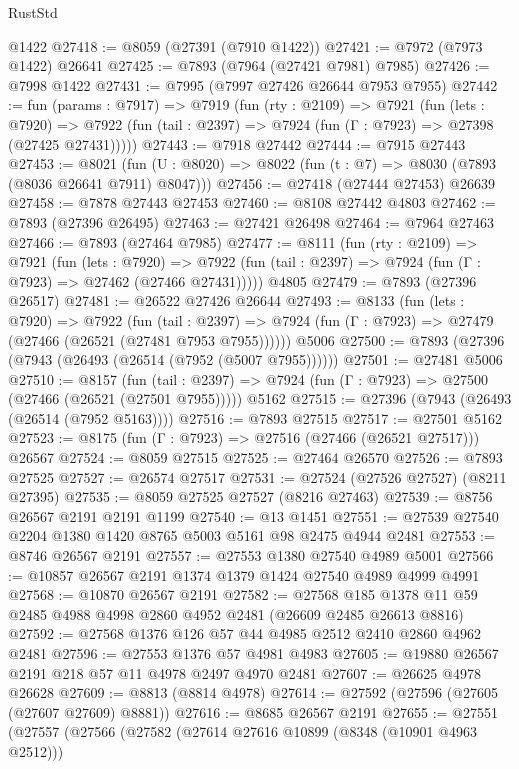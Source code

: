 \begin{lexlean}{RustStd}
\begin{coremodule}
    @1422
@27418 := @8059 (@27391 (@7910 @1422))
@27421 := @7972 (@7973 @1422) @26641
@27425 := @7893 (@7964 (@27421 @7981) @7985)
@27426 := @7998 @1422
@27431 := @7995 (@7997 @27426 @26644 @7953 @7955)
@27442 := fun (params : @7917) =>
  @7919
    (fun (rty : @2109) =>
    @7921
      (fun (lets : @7920) =>
      @7922 (fun (tail : @2397) => @7924 (fun (Γ : @7923) => @27398 (@27425 @27431)))))
@27443 := @7918 @27442
@27444 := @7915 @27443
@27453 := @8021
    (fun (U : @8020) => @8022 (fun (t : @7) => @8030 (@7893 (@8036 @26641 @7911) @8047)))
@27456 := @27418 (@27444 @27453) @26639
@27458 := @7878 @27443 @27453
@27460 := @8108 @27442 @4803
@27462 := @7893 (@27396 @26495)
@27463 := @27421 @26498
@27464 := @7964 @27463
@27466 := @7893 (@27464 @7985)
@27477 := @8111
    (fun (rty : @2109) =>
    @7921
      (fun (lets : @7920) =>
      @7922 (fun (tail : @2397) => @7924 (fun (Γ : @7923) => @27462 (@27466 @27431)))))
    @4805
@27479 := @7893 (@27396 @26517)
@27481 := @26522 @27426 @26644
@27493 := @8133
    (fun (lets : @7920) =>
    @7922
      (fun (tail : @2397) =>
      @7924 (fun (Γ : @7923) => @27479 (@27466 (@26521 (@27481 @7953 @7955))))))
    @5006
@27500 := @7893 (@27396 (@7943 (@26493 (@26514 (@7952 (@5007 @7955))))))
@27501 := @27481 @5006
@27510 := @8157
    (fun (tail : @2397) => @7924 (fun (Γ : @7923) => @27500 (@27466 (@26521 (@27501 @7955)))))
    @5162
@27515 := @27396 (@7943 (@26493 (@26514 (@7952 @5163))))
@27516 := @7893 @27515
@27517 := @27501 @5162
@27523 := @8175 (fun (Γ : @7923) => @27516 (@27466 (@26521 @27517))) @26567
@27524 := @8059 @27515
@27525 := @27464 @26570
@27526 := @7893 @27525
@27527 := @26574 @27517
@27531 := @27524 (@27526 @27527) (@8211 @27395)
@27535 := @8059 @27525 @27527 (@8216 @27463)
@27539 := @8756 @26567 @2191 @2191 @1199
@27540 := @13 @1451
@27551 := @27539 @27540 @2204 @1380 @1420 @8765 @5003 @5161 @98 @2475 @4944 @2481
@27553 := @8746 @26567 @2191
@27557 := @27553 @1380 @27540 @4989 @5001
@27566 := @10857 @26567 @2191 @1374 @1379 @1424 @27540 @4989 @4999 @4991
@27568 := @10870 @26567 @2191
@27582 := @27568 @185 @1378 @11 @59 @2485 @4988 @4998 @2860 @4952 @2481 (@26609 @2485 @26613 @8816)
@27592 := @27568 @1376 @126 @57 @44 @4985 @2512 @2410 @2860 @4962 @2481
@27596 := @27553 @1376 @57 @4981 @4983
@27605 := @19880 @26567 @2191 @218 @57 @11 @4978 @2497 @4970 @2481
@27607 := @26625 @4978 @26628
@27609 := @8813 (@8814 @4978)
@27614 := @27592 (@27596 (@27605 (@27607 @27609) @8881))
@27616 := @8685 @26567 @2191
@27655 := @27551
    (@27557
      (@27566
        (@27582
          (@27614 @27616 @10899 (@8348 (@10901 @4963 @2512)))

\end{coremodule}
\end{lexlean}
